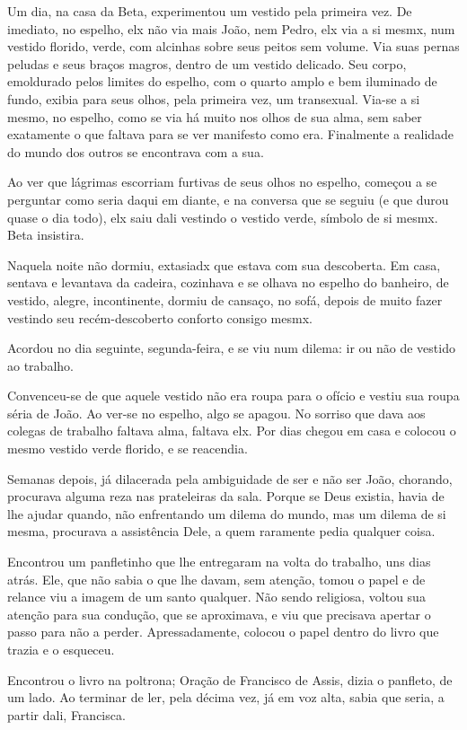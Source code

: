 \documentclass[11pt,a4paper,twoside,openany]{book}
\begin{document}
Um dia, na casa da Beta, experimentou um vestido pela primeira vez. De imediato, no espelho, elx não via mais João, nem Pedro, elx via a si mesmx, num vestido florido, verde, com alcinhas sobre seus peitos sem volume. Via suas pernas peludas e seus braços magros, dentro de um vestido delicado. Seu corpo, emoldurado pelos limites do espelho, com o quarto amplo e bem iluminado de fundo, exibia para seus olhos, pela primeira vez, um transexual. Via-se a si mesmo, no espelho, como se via há muito nos olhos de sua alma, sem saber exatamente o que faltava para se ver manifesto como era. Finalmente a realidade do mundo dos outros se encontrava com a sua.

Ao ver que lágrimas escorriam furtivas de seus olhos no espelho, começou a se perguntar como seria daqui em diante, e na conversa que se seguiu (e que durou quase o dia todo), elx saiu dali vestindo o vestido verde, símbolo de si mesmx. Beta insistira.

Naquela noite não dormiu, extasiadx que estava com sua descoberta. Em casa, sentava e levantava da cadeira, cozinhava e se olhava no espelho do banheiro, de vestido, alegre, incontinente, dormiu de cansaço, no sofá, depois de muito fazer vestindo seu recém-descoberto conforto consigo mesmx.

Acordou no dia seguinte, segunda-feira, e se viu num dilema: ir ou não de vestido ao trabalho. 

Convenceu-se de que aquele vestido não era roupa para o ofício e vestiu sua roupa séria de João. Ao ver-se no espelho, algo se apagou. No sorriso que dava aos colegas de trabalho faltava alma, faltava elx. Por dias chegou em casa e colocou o mesmo vestido verde florido, e se reacendia.

Semanas depois, já dilacerada pela ambiguidade de ser e não ser João, chorando, procurava alguma reza nas prateleiras da sala. Porque se Deus existia, havia de lhe ajudar quando, não enfrentando um dilema do mundo, mas um dilema de si mesma, procurava a assistência Dele, a quem raramente pedia qualquer coisa.

Encontrou um panfletinho que lhe entregaram na volta do trabalho, uns dias atrás. Ele, que não sabia o que lhe davam, sem atenção, tomou o papel e de relance viu a imagem de um santo qualquer. Não sendo religiosa, voltou sua atenção para sua condução, que se aproximava, e viu que precisava apertar o passo para não a perder. Apressadamente, colocou o papel dentro do livro que trazia e o esqueceu. 

Encontrou o livro na poltrona; Oração de Francisco de Assis, dizia o panfleto, de um lado. Ao terminar de ler, pela décima vez, já em voz alta, sabia que seria, a partir dali, Francisca.
\end{document}
